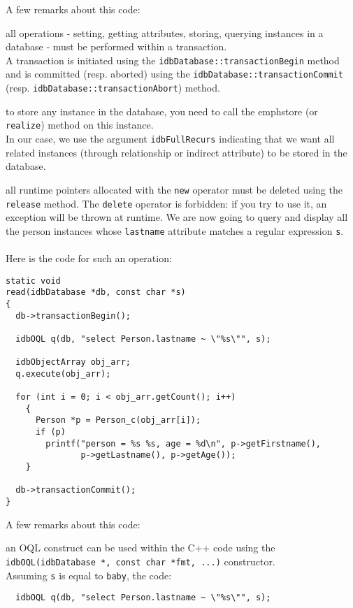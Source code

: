 \normalsize
A few remarks about this code:
\be
\item all operations - setting, getting attributes, storing, querying instances
in a database - must be performed within a transaction. \\
A transaction is initiated using the \texttt{idbDatabase::transactionBegin}
method and is committed (resp. aborted) using the
\texttt{idbDatabase::transactionCommit}
(resp. \texttt{idbDatabase::transactionAbort}) method.
\item to store any instance in the database, you need to call the 
emph{store} (or \texttt{realize}) method on this instance.\\
In our case, we use the argument \texttt{idbFullRecurs} indicating that
we want all related instances (through relationship or indirect
attribute) to be stored in the database.
\item all runtime pointers allocated with the \texttt{new} operator must
be deleted using the \texttt{release} method. The \texttt{delete} operator
is forbidden: if you try to use it, an exception will be thrown at
runtime.
\ee
We are now going to query and display all the person instances 
whose \texttt{lastname} attribute matches a regular expression \texttt{s}.
\\
\\
Here is the code for such an operation:
\verbsize \begin{verbatim}
static void
read(idbDatabase *db, const char *s)
{
  db->transactionBegin();

  idbOQL q(db, "select Person.lastname ~ \"%

  idbObjectArray obj_arr;
  q.execute(obj_arr);

  for (int i = 0; i < obj_arr.getCount(); i++)
    {
      Person *p = Person_c(obj_arr[i]);
      if (p)
        printf("person = %
               p->getLastname(), p->getAge());
    }

  db->transactionCommit();
}
\end{verbatim}
\normalsize
A few remarks about this code:
\be
\item an OQL construct can be used within the C++ code using the
\texttt{idbOQL(idbDatabase *, const char *fmt, ...)} constructor.
\\
Assuming \texttt{s} is equal to \texttt{baby}, the code:
\verbsize \begin{verbatim}
  idbOQL q(db, "select Person.lastname ~ \"%
\end{verbatim}
